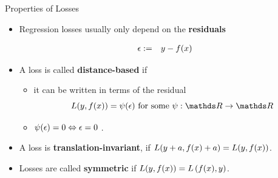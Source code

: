 \begin{vbframe}{Properties of Losses}

\begin{itemize}
  \item Regression losses usually only depend on the \textbf{ residuals}

  \vspace*{-0.5cm}

  \begin{eqnarray*}
    \eps &:=& y - \fx %
  \end{eqnarray*}

  \item A loss is called \textbf{distance-based} if
  \begin{itemize}
    \item it can be written in terms of the residual
    $$
      \Lxy = \psi (\eps) \text{ for some } \psi: \R \to \R
    $$
    \item $\psi(\epsilon) = 0 \Leftrightarrow \epsilon = 0$ .
  \end{itemize}
  \item A loss is \textbf{translation-invariant}, if $L(y + a, f(x) + a) = L(y, f(x))$.
  \item Losses are called \textbf{symmetric} if $L(y, f(x)) = L\left(f(x), y\right)$. 
\end{itemize}

\end{vbframe}



